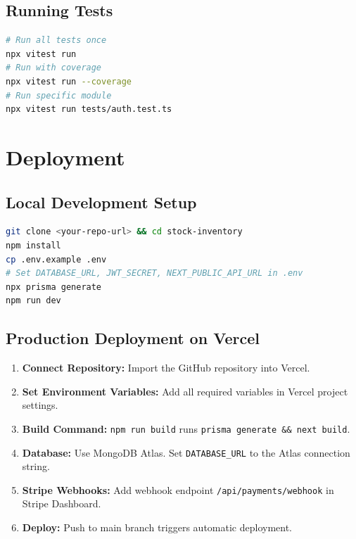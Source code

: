 \documentclass[12pt,a4paper]{report}
\begin{document}
\subsection{Running Tests}
\begin{lstlisting}[language=bash,caption={Test execution commands}]
# Run all tests once
npx vitest run
# Run with coverage
npx vitest run --coverage
# Run specific module
npx vitest run tests/auth.test.ts
\end{lstlisting}

\section{Deployment}
\subsection{Local Development Setup}
\begin{lstlisting}[language=bash,caption={Local setup}]
git clone <your-repo-url> && cd stock-inventory
npm install
cp .env.example .env
# Set DATABASE_URL, JWT_SECRET, NEXT_PUBLIC_API_URL in .env
npx prisma generate
npm run dev
\end{lstlisting}

\subsection{Production Deployment on Vercel}
\begin{enumerate}[leftmargin=1.5em]
  \item \textbf{Connect Repository:} Import the GitHub repository into Vercel.
  \item \textbf{Set Environment Variables:} Add all required variables in Vercel project settings.
  \item \textbf{Build Command:} \texttt{npm run build} runs \texttt{prisma generate \&\& next build}.
  \item \textbf{Database:} Use MongoDB Atlas. Set \texttt{DATABASE\_URL} to the Atlas connection string.
  \item \textbf{Stripe Webhooks:} Add webhook endpoint \texttt{/api/payments/webhook} in Stripe Dashboard.
  \item \textbf{Deploy:} Push to main branch triggers automatic deployment.
\end{enumerate}
\end{document}
